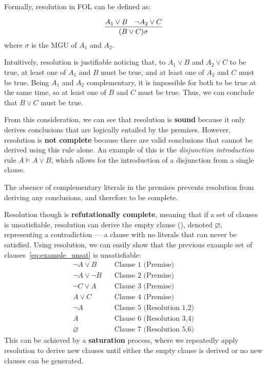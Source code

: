 Formally, resolution in FOL can be defined as:

\begin{equation}
  \infer{(B\lor C)\sigma}{A_1 \lor B & \neg A_2 \lor C}
\end{equation}
where \(\sigma\) is the MGU of \(A_1\) and \(A_2\).

Intuitively, resolution is justifiable noticing that, to \(A_1 \lor B\) and \(A_2 \lor C\) to be true, at least one of \(A_1\) and \(B\) must be true, and at least one of \(A_2\) and \(C\) must be true.
Being \(A_1\) and \(A_2\) complementary, it is impossible for both to be true at the same time, so at least one of \(B\) and \(C\) must be true. Thus, we can conclude that \(B \lor C\) must be true.

From this consideration, we can see that resolution is \textbf{sound} because it only derives conclusions that are logically entailed by the premises.
However, resolution is \textbf{not complete} because there are valid conclusions that cannot be derived using this rule alone.
An example of this is the \textit{disjunction introduction} rule \(A \models A \lor B\), which allows for the introduction of a disjunction from a single clause.

The absence of complementary literals in the premises prevents resolution from deriving any conclusions, and therefore to be complete.

Resolution though is \textbf{refutationally complete}, meaning that if a set of clauses is unsatisfiable, resolution can derive the empty clause (\citeauthor{robinson1965}\cite{robinson1965}), denoted \(\varnothing\), representing a contradiction --- a clause with no literals that can never be satisfied.
Using resolution, we can easily show that the previous example set of clauses~\ref{eq:example_unsat} is unsatisfiable:
\begin{equation}
  \begin{aligned}
    \neg A \lor B &\quad \text{Clause 1 (Premise)} \\
    \neg A \lor \neg B &\quad \text{Clause 2 (Premise)} \\
    \neg C \lor A &\quad \text{Clause 3 (Premise)} \\
    A \lor C &\quad \text{Clause 4 (Premise)} \\
    \neg A &\quad \text{Clause 5 (Resolution 1,2)} \\
    A &\quad \text{Clause 6 (Resolution 3,4)} \\
    \varnothing &\quad \text{Clause 7 (Resolution 5,6)}
  \end{aligned}
\end{equation}
This can be achieved by a \textbf{saturation} process, where we repeatedly apply resolution to derive new clauses until either the empty clause is derived or no new clauses can be generated.

